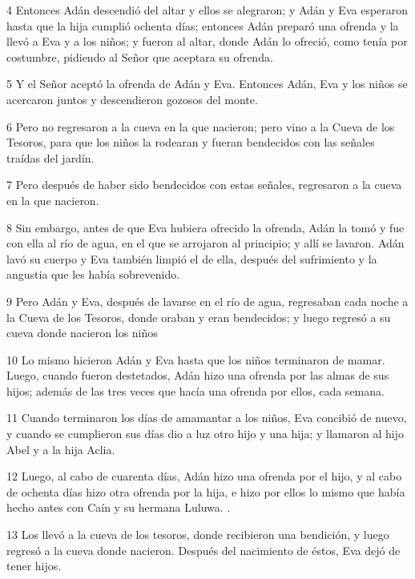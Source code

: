 \par 4 Entonces Adán descendió del altar y ellos se alegraron; y Adán y Eva esperaron hasta que la hija cumplió ochenta días; entonces Adán preparó una ofrenda y la llevó a Eva y a los niños; y fueron al altar, donde Adán lo ofreció, como tenía por costumbre, pidiendo al Señor que aceptara su ofrenda.

\par 5 Y el Señor aceptó la ofrenda de Adán y Eva. Entonces Adán, Eva y los niños se acercaron juntos y descendieron gozosos del monte.

\par 6 Pero no regresaron a la cueva en la que nacieron; pero vino a la Cueva de los Tesoros, para que los niños la rodearan y fueran bendecidos con las señales traídas del jardín.

\par 7 Pero después de haber sido bendecidos con estas señales, regresaron a la cueva en la que nacieron.

\par 8 Sin embargo, antes de que Eva hubiera ofrecido la ofrenda, Adán la tomó y fue con ella al río de agua, en el que se arrojaron al principio; y allí se lavaron. Adán lavó su cuerpo y Eva también limpió el de ella, después del sufrimiento y la angustia que les había sobrevenido.

\par 9 Pero Adán y Eva, después de lavarse en el río de agua, regresaban cada noche a la Cueva de los Tesoros, donde oraban y eran bendecidos; y luego regresó a su cueva donde nacieron los niños

\par 10 Lo mismo hicieron Adán y Eva hasta que los niños terminaron de mamar. Luego, cuando fueron destetados, Adán hizo una ofrenda por las almas de sus hijos; además de las tres veces que hacía una ofrenda por ellos, cada semana.

\par 11 Cuando terminaron los días de amamantar a los niños, Eva concibió de nuevo, y cuando se cumplieron sus días dio a luz otro hijo y una hija; y llamaron al hijo Abel y a la hija Aclia.

\par 12 Luego, al cabo de cuarenta días, Adán hizo una ofrenda por el hijo, y al cabo de ochenta días hizo otra ofrenda por la hija, e hizo por ellos lo mismo que había hecho antes con Caín y su hermana Luluwa. .

\par 13 Los llevó a la cueva de los tesoros, donde recibieron una bendición, y luego regresó a la cueva donde nacieron. Después del nacimiento de éstos, Eva dejó de tener hijos.

